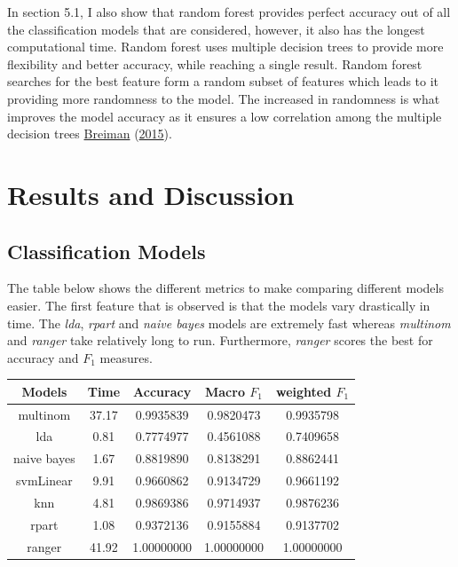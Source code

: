 \documentclass[11pt,preprint, authoryear]{elsarticle}
\numberwithin{equation}{section}
\numberwithin{figure}{section}
\numberwithin{table}{section}
\begin{document}
In section 5.1, I also show that random forest provides perfect accuracy
out of all the classification models that are considered, however, it
also has the longest computational time. Random forest uses multiple
decision trees to provide more flexibility and better accuracy, while
reaching a single result. Random forest searches for the best feature
form a random subset of features which leads to it providing more
randomness to the model. The increased in randomness is what improves
the model accuracy as it ensures a low correlation among the multiple
decision trees \protect\hyperlink{ref-breiman2015random}{Breiman}
(\protect\hyperlink{ref-breiman2015random}{2015}).

\hypertarget{results-and-discussion}{%
\section{Results and Discussion}\label{results-and-discussion}}

\hypertarget{classification-models}{%
\subsection{Classification Models}\label{classification-models}}

The table below shows the different metrics to make comparing different
models easier. The first feature that is observed is that the models
vary drastically in time. The \emph{lda}, \emph{rpart} and
\emph{naive bayes} models are extremely fast whereas \emph{multinom} and
\emph{ranger} take relatively long to run. Furthermore, \emph{ranger}
scores the best for accuracy and \(F_1\) measures.

\begin{center}
\begin{tabular}{| c| c| c |c| c|}
\hline
\textbf{Models} & \textbf{Time} & \textbf{Accuracy} & \textbf{Macro \(F_1\)} & \textbf{weighted \(F_1\)} \\
\hline
multinom & 37.17 & 0.9935839 & 0.9820473 & 0.9935798 \\
\hline
lda & 0.81 & 0.7774977 & 0.4561088 & 0.7409658 \\
\hline
naive bayes & 1.67 & 0.8819890 & 0.8138291 & 0.8862441 \\
\hline
svmLinear & 9.91 & 0.9660862 & 0.9134729 & 0.9661192 \\
\hline
knn & 4.81 & 0.9869386 & 0.9714937 & 0.9876236 \\
\hline 
rpart & 1.08 & 0.9372136 & 0.9155884 & 0.9137702 \\
\hline 
ranger & 41.92 & 1.00000000 & 1.00000000 & 1.00000000 \\
\hline
\end{tabular}
\end{center}
\end{document}
